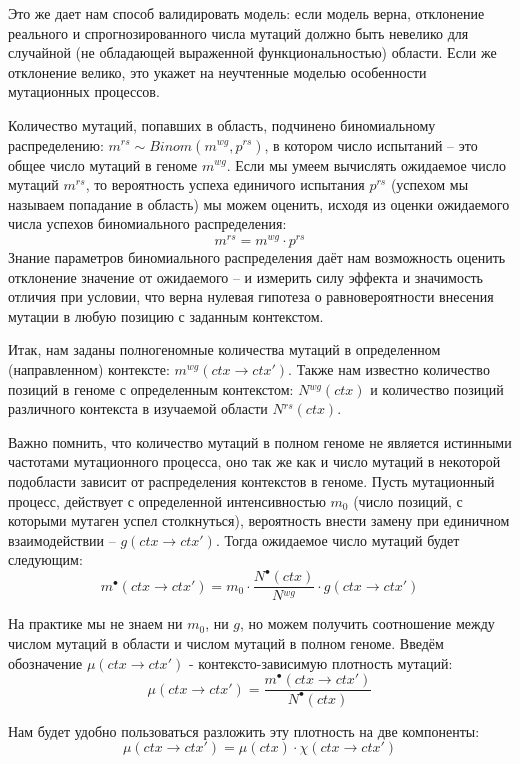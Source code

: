 \documentclass[a4paper]{article}
\newcommand\wg{{}^{wg}}
\newcommand\rs{{}^{rs}}
\newcommand\dirctx{ctx\to ctx'}
\begin{document}
Это же дает нам способ валидировать модель: если модель верна, отклонение реального и спрогнозированного числа мутаций должно быть невелико для случайной (не обладающей выраженной функциональностью) области. Если же отклонение велико, это укажет на неучтенные моделью особенности мутационных процессов.

Количество мутаций, попавших в область, подчинено биномиальному распределению: $m\rs \sim Binom(m\wg, p\rs)$, в котором число испытаний -- это общее число мутаций в геноме $m\wg$. Если мы умеем вычислять ожидаемое число мутаций $m\rs$, то вероятность успеха единичого испытания $p\rs$ (успехом мы называем попадание в область) мы можем оценить, исходя из оценки ожидаемого числа успехов биномиального распределения:
\begin{equation}\label{prob_to_hit_region}
m\rs = m\wg\cdot p\rs
\end{equation}
Знание параметров биномиального распределения даёт нам возможность оценить отклонение значение от ожидаемого -- и измерить силу эффекта и значимость отличия при условии, что верна нулевая гипотеза о равновероятности внесения мутации в любую позицию с заданным контекстом.

Итак, нам заданы полногеномные количества мутаций в определенном (направленном) контексте: $m\wg(ctx \to ctx')$. Также нам известно количество позиций в геноме с определенным контекстом: $N\wg(ctx)$ и количество позиций различного контекста в изучаемой области $N\rs(ctx)$.

Важно помнить, что количество мутаций в полном геноме не является истинными частотами мутационного процесса, оно так же как и число мутаций в некоторой подобласти зависит от распределения контекстов в геноме. Пусть мутационный процесс, действует с определенной интенсивностью $m_0$ (число позиций, с которыми мутаген успел столкнуться), вероятность внести замену при единичном взаимодействии -- $g(\dirctx)$. Тогда ожидаемое число мутаций будет следующим:
$$m^{\bullet}(\dirctx) = m_0\cdot \frac{N^{\bullet}(ctx)}{N\wg}\cdot g(\dirctx)$$

На практике мы не знаем ни $m_0$, ни $g$, но можем получить соотношение между числом мутаций в области и числом мутаций в полном геноме. Введём обозначение $\mu(\dirctx)$ - контексто-зависимую плотность мутаций:
\begin{equation}\label{mu-def}
	\mu(\dirctx) = \frac{m^{\bullet}(\dirctx)}{N^{\bullet}(ctx)}
\end{equation}

\noindent Нам будет удобно пользоваться разложить эту плотность на две компоненты:
\begin{equation}
	\mu(\dirctx) = \mu(ctx)\cdot\chi(\dirctx)
\end{equation}
\end{document}
